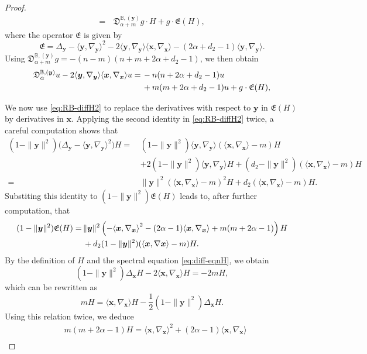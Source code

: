 \documentclass[10pt,a4paper]{amsart}
\def\BB{{\mathbb B}}
\def\a{{\alpha}}
\def\fD{{\mathfrak D}}
\def\fE{{\mathfrak E}}
\def\la{{\langle}}
\def\ra{{\rangle}}
\def\xb{{\bm x}}
\def\yb{{\bm y}}
\begin{document}
\begin{proof}
\begin{align*}
    = \, & \fD_{\a+ m}^{\BB, (\yb)}g\cdot H  + g \cdot \fE(H) ,
\end{align*}
where the operator $\fE$ is given by 
$$
  \fE = \Delta_\yb - \la \yb,\nabla_{\yb} \ra^2 -2 \la \yb,\nabla_{\yb} \ra \la \xb,\nabla_{\xb} \ra
  - (2\a + d_2 -1)  \la \yb,\nabla_{\yb} \ra.  
$$
Using $\fD_{\a+ m}^{\BB, (\yb)}g = - (n-m) (n+m + 2\a + d_2 -1)$, %
we then obtain
\begin{align}\label{eq:Dmu_RB}
\fD_\a^{\BB, (\yb)} u -2 \la \yb,\nabla_{\yb} \ra \la \xb,\nabla_{\xb} \ra u 
     =\,&   -n(n+2\a+d_2 -1) u  \\
     &  + m (m+2\a+d_2 -1) u + g \cdot \fE(H), \notag
\end{align}

We now use \eqref{eq:RB-diffH2} to replace the derivatives with respect to $\yb$ in $\fE(H)$ by derivatives in
$\xb$. Applying the second identity in \eqref{eq:RB-diffH2} twice, a careful computation shows that 
\begin{align*}
 (1-\|\yb\|^2) \big(\Delta_\yb -   \la \yb,\nabla_{\yb} \ra^2\big)H =\, &
       (1-\|\yb\|^2) \la \yb,\nabla_{\yb} \ra ( \la \xb,\nabla_{\xb} \ra - m )H\\
  &   + 2 (1-\|\yb\|^2)  \la \yb,\nabla_{\yb} \ra H 
     + (d_2 - \|\yb\|^2) ( \la \xb,\nabla_{\xb} \ra -m )H \\
   = &\|\yb\|^2 
       ( \la \xb,\nabla_{\xb} \ra -m )^2 H 
     +  d_2 ( \la \xb,\nabla_{\xb} \ra -m )H.
\end{align*}
Substiting this identity to $(1-\|\yb\|^2) \fE(H)$ leads to, after further computation, that 
\begin{align} \label{eq:EH-R}
 (1-\|\yb\|^2) \fE(H) = \, & \|\yb\|^2 \left(-\la \xb,\nabla_{\xb} \ra^2 - (2\a -1) \la \xb,\nabla_{\xb} \ra+ m(m+2 \a -1) \right)H \\
     & + d_2 (1-\|\yb\|^2) (\la \xb, \nabla \xb\ra -m)H. \notag
\end{align}
By the definition of $H$ and the spectral equation \eqref{eq:diff-eqnH}, we obtain
\begin{equation} \label{eq:diffH-RB}
    (1-\|\yb\|^2) \Delta_\xb H - 2 \la \xb, \nabla_\xb \ra H = - 2 m H,
\end{equation}
which can be rewritten as 
$$
   m H = \la \xb, \nabla_\xb \ra H - \frac12 (1-\|\yb\|^2) \Delta_{\xb} H.
$$
Using this relation twice, we deduce 
\begin{align} \label{eq:mm-H}
   & m(m+ 2 \a -1) H  = \la \xb, \nabla_\xb \ra^2 + (2\a-1)  \la \xb, \nabla_\xb \ra \\

\end{align}
\end{proof}
\end{document}
